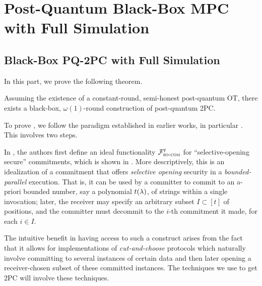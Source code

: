 
\section{Post-Quantum Black-Box MPC with Full Simulation}
\label{sec:full-MPC}

\subsection{Black-Box PQ-2PC with Full Simulation}
\label{sec:full-MPC:2PC}
In this part, we prove the following theorem.
\begin{theorem}\label{thm:2pc:main}
Assuming the existence of a constant-round, semi-honest post-quantum OT, there exists a black-box, $\omega(1)$-round construction of post-quantum 2PC. 
\end{theorem}

To prove , we follow the paradigm established in earlier works, in particular \cite{EC:GLSV21,C:CCLY22}. This involves two steps.

 In \cite{C:CCLY22}, the authors first define an ideal functionality $\mathcal{F}^t_\textsc{so-com}$ for ``selective-opening secure'' commitments, which is shown in . More descriptively, this is an idealization of a commitment that offers {\em selective opening} security in a {\em bounded-parallel} execution. That is, it can be used by a committer to commit to an a-priori bounded number, say a polynomial $t(\lambda)$, of strings within a single invocation; later, the receiver may specify an arbitrary subset $I \subset [t]$ of positions, and the committer must decommit to the $i$-th commitment it made, for each $i \in I$.

The intuitive benefit in having access to such a construct arises from the fact that it allows for implementations of {\em cut-and-choose} protocols which naturally involve committing to several instances of certain data and then later opening a receiver-chosen subset of these committed instances. The techniques we use to get 2PC will involve these techniques. 



